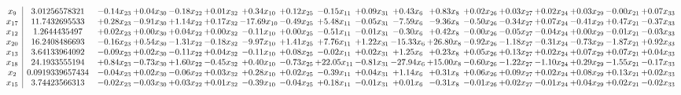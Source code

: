 \documentclass[9pt]{article}
\begin{document}
 \[\begin{array}{c| c c@{\hskip 2pt} c@{\hskip 2pt} c@{\hskip 2pt} c@{\hskip 2pt} c@{\hskip 2pt} c@{\hskip 2pt} c@{\hskip 2pt} c@{\hskip 2pt} c@{\hskip 2pt} c@{\hskip 2pt} c@{\hskip 2pt} c@{\hskip 2pt} c@{\hskip 2pt} c@{\hskip 2pt} c@{\hskip 2pt} c@{\hskip 2pt} }
 x_{9}   &  3.01256578321 & -0.14 x_{23} & +  0.04 x_{30} & -0.18 x_{22} & +  0.01 x_{32} & +  0.34 x_{10} & +  0.12 x_{25} & -0.15 x_{11} & +  0.09 x_{31} & +  0.43 x_{6} & +  0.83 x_{8} & +  0.02 x_{26} & +  0.03 x_{27} & +  0.02 x_{24} & +  0.03 x_{29} & -0.00 x_{21} & +  0.07 x_{33}\\
 x_{17}   &  11.7432695533 & +  0.28 x_{23} & -0.91 x_{30} & +  1.14 x_{22} & +  0.17 x_{32} & -17.69 x_{10} & -0.49 x_{25} & +  5.48 x_{11} & -0.05 x_{31} & -7.59 x_{6} & -9.36 x_{8} & -0.50 x_{26} & -0.34 x_{27} & +  0.07 x_{24} & -0.41 x_{29} & +  0.47 x_{21} & -0.37 x_{33}\\
 x_{12}   &  1.2644435497 & +  0.02 x_{23} & +  0.00 x_{30} & +  0.04 x_{22} & +  0.00 x_{32} & -0.11 x_{10} & +  0.00 x_{25} & -0.51 x_{11} & -0.01 x_{31} & -0.30 x_{6} & +  0.42 x_{8} & -0.00 x_{26} & -0.05 x_{27} & -0.04 x_{24} & +  0.00 x_{29} & -0.01 x_{21} & -0.03 x_{33}\\
 x_{20}   &  16.2408486693 & -0.16 x_{23} & +  0.54 x_{30} & -1.31 x_{22} & -0.18 x_{32} & -9.97 x_{10} & +  1.41 x_{25} & +  7.76 x_{11} & +  1.22 x_{31} & -15.33 x_{6} & + 26.80 x_{8} & -0.92 x_{26} & -1.18 x_{27} & -0.31 x_{24} & -0.73 x_{29} & -1.87 x_{21} & +  0.92 x_{33}\\
 x_{13}   &  3.64133964092 & -0.09 x_{23} & +  0.02 x_{30} & -0.11 x_{22} & +  0.04 x_{32} & -0.11 x_{10} & +  0.08 x_{25} & -0.02 x_{11} & +  0.02 x_{31} & +  1.25 x_{6} & +  0.23 x_{8} & +  0.05 x_{26} & +  0.13 x_{27} & +  0.02 x_{24} & +  0.07 x_{29} & +  0.07 x_{21} & +  0.04 x_{33}\\
 x_{18}   &  24.1933555194 & +  0.84 x_{23} & -0.73 x_{30} & +  1.60 x_{22} & -0.45 x_{32} & +  0.40 x_{10} & -0.73 x_{25} & + 22.05 x_{11} & -0.81 x_{31} & -27.94 x_{6} & + 15.00 x_{8} & -0.60 x_{26} & -1.22 x_{27} & -1.10 x_{24} & +  0.29 x_{29} & -1.55 x_{21} & -0.17 x_{33}\\
 x_{2}   &  0.0919339657434 & -0.04 x_{23} & +  0.02 x_{30} & -0.06 x_{22} & +  0.03 x_{32} & +  0.28 x_{10} & +  0.02 x_{25} & -0.39 x_{11} & +  0.04 x_{31} & +  1.14 x_{6} & +  0.31 x_{8} & +  0.06 x_{26} & +  0.09 x_{27} & +  0.02 x_{24} & +  0.08 x_{29} & +  0.13 x_{21} & +  0.02 x_{33}\\
 x_{15}   &  3.74423566313 & -0.02 x_{23} & -0.03 x_{30} & +  0.03 x_{22} & +  0.01 x_{32} & -0.39 x_{10} & -0.04 x_{25} & +  0.18 x_{11} & -0.01 x_{31} & +  0.01 x_{6} & -0.31 x_{8} & -0.01 x_{26} & +  0.02 x_{27} & -0.01 x_{24} & +  0.04 x_{29} & +  0.02 x_{21} & -0.02 x_{33}\\

\end{array}\]
\end{document}
